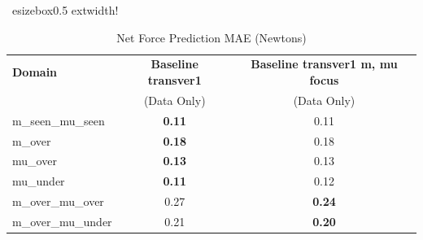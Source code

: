 \begin{table}[p]
    \centering
    \caption{Net Force Prediction MAE (Newtons)}
    \vspace{2mm}
    \
esizebox{0.5	extwidth}{!}{
    \begin{tabular}{l cc}
        \toprule
        \textbf{Domain} & \textbf{Baseline transver1} & \textbf{Baseline transver1 m, mu focus} \\
         & (Data Only) & (Data Only) \\
        \midrule
        m\_seen\_mu\_seen & \textbf{0.11} & 0.11 \\
        m\_over & \textbf{0.18} & 0.18 \\
        mu\_over & \textbf{0.13} & 0.13 \\
        mu\_under & \textbf{0.11} & 0.12 \\
        m\_over\_mu\_over & 0.27 & \textbf{0.24} \\
        m\_over\_mu\_under & 0.21 & \textbf{0.20} \\
        \bottomrule
    \end{tabular}
    }
\end{table}